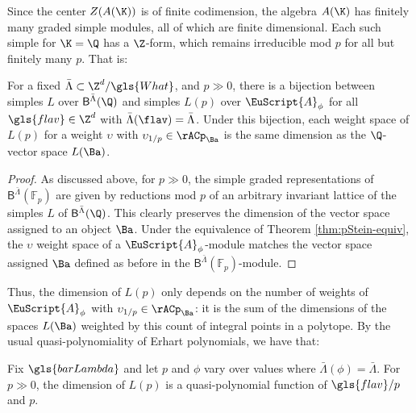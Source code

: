 Since the center $Z(A(\K))$ is of finite
codimension, the algebra $A(\K)$ has finitely many graded simple
modules, all of which are finite dimensional.  Each such simple for
$\K=\Q$ has a $\Z$-form, which remains irreducible mod $p$ for all but finitely
many $p$.  That is:
\begin{theorem}
For a fixed  $\bar
\Lambda\subset \Z^d/\gls{What}$, and  $p\gg 0$, there is a bijection
between simples $L$ over $\mathsf{B}^{\bar \Lambda}(\Q)$  and simples $L(p)$ over $\EuScript{A}_{\phi}$ for all $\gls{flav}\in \Z^d$ with $\bar
\Lambda(\flav)=\bar \Lambda$.   Under this bijection,  each weight space of
$L(p)$ for a weight $\upsilon$ with $\upsilon_{1/p}\in \rACp_{\Ba}$ is the same
dimension as the $\Q$-vector space $L(\Ba)$.  
\end{theorem}
\begin{proof}
  As discussed above, for $p\gg 0$, the simple graded representations
  of $\mathsf{B}^{\bar \Lambda}({\mathbb{F}_p})$ are given by reductions mod $p$ of an
  arbitrary invariant lattice of the
  simples $L$ of $\mathsf{B}^{\bar \Lambda}(\Q)$.  This clearly preserves the dimension
  of the vector space assigned to an object $\Ba$.  Under the
  equivalence of Theorem \ref{thm:pStein-equiv}, the $\upsilon$ weight space of
  a $\EuScript{A}_{\phi}$-module matches the vector space assigned
  $\Ba$ defined as before in the $\mathsf{B}^{\bar \Lambda}({\mathbb{F}_p})$-module.  
\end{proof}
Thus, the dimension of $L(p)$ only depends on the number of weights of
$\EuScript{A}_{\phi}$  with $\upsilon_{1/p}\in \rACp_{\Ba}$: it is the sum of the
dimensions of the 
spaces $L(\Ba)$ weighted by this count of integral points in a
polytope.  By the usual quasi-polynomiality of Erhart polynomials, we have that:
\begin{corollary} Fix $\gls{barLambda}$ and  let $p$ and $\phi$ vary over values where $\bar{\Lambda}(\phi)=\bar{\Lambda}$.  
  For $p\gg 0$, the dimension of $L(p)$ is a quasi-polynomial function of $\gls{flav}/p$ and
  $p$.  
\end{corollary}

